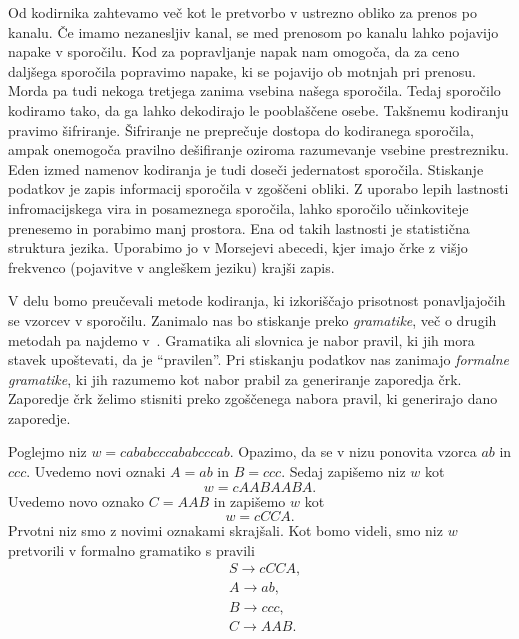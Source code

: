 \documentclass[fin1, tisk]{fmfdelo}
\theoremstyle{definition}
\begin{document}
Od kodirnika zahtevamo več kot le pretvorbo v ustrezno obliko za prenos po kanalu.
Če imamo nezanesljiv kanal, se med prenosom po kanalu lahko pojavijo napake v sporočilu.
Kod za popravljanje napak nam omogoča, da za ceno daljšega sporočila popravimo napake, ki se 
pojavijo ob motnjah pri prenosu. %
Morda pa tudi nekoga tretjega zanima vsebina našega sporočila. Tedaj sporočilo kodiramo
tako, da ga lahko dekodirajo le pooblaščene osebe. Takšnemu kodiranju pravimo
šifriranje. Šifriranje ne preprečuje dostopa do kodiranega sporočila, ampak onemogoča pravilno
dešifiranje oziroma razumevanje vsebine prestrezniku. %
Eden izmed namenov kodiranja je tudi doseči jedernatost sporočila. Stiskanje podatkov 
je zapis informacij sporočila v zgoščeni obliki. Z uporabo lepih lastnosti infromacijskega vira 
in posameznega sporočila, lahko sporočilo učinkoviteje prenesemo in porabimo manj prostora. Ena 
od takih lastnosti je statistična struktura jezika. Uporabimo jo v Morsejevi abecedi, kjer
imajo črke z višjo frekvenco (pojavitve v angleškem jeziku) krajši zapis. %

V delu bomo preučevali metode kodiranja, ki izkoriščajo prisotnost ponavljajočih se vzorcev
v sporočilu. Zanimalo nas bo stiskanje preko \emph{gramatike}, več o drugih metodah pa najdemo 
v~\cite{Sayood2017}. Gramatika ali slovnica je nabor pravil, ki jih mora stavek 
upoštevati, da je ``pravilen''. Pri stiskanju podatkov nas zanimajo \emph{formalne gramatike}, 
ki jih razumemo kot nabor prabil za generiranje zaporedja črk. Zaporedje črk želimo 
stisniti preko zgoščenega nabora pravil, ki generirajo dano zaporedje.

\begin{primer}
    \label{primer:motivacija}
    Poglejmo niz $w =\mathit{cababcccababcccab}$.
    Opazimo, da se v nizu ponovita vzorca $\mathit{ab}$ in $\mathit{ccc}$. Uvedemo novi oznaki
    $A = \mathit{ab}$ in $B = \mathit{ccc}$. Sedaj zapišemo niz $w$ kot
    \[
        w = \mathit{cAABAABA}.
    \]
    Uvedemo novo oznako $C = \mathit{AAB}$
    in zapišemo $w$ kot
    \[
        w = \mathit{cCCA}.
    \]
    Prvotni niz smo z novimi oznakami skrajšali. Kot bomo videli, smo niz $w$ pretvorili v 
    formalno gramatiko s pravili
    \begin{align*}
        & S  \rightarrow \mathit{cCCA}, \\
        & A  \rightarrow \mathit{ab}, \\
        & B  \rightarrow \mathit{ccc}, \\
        & C  \rightarrow \mathit{AAB}.
    \end{align*}
\end{primer}
\end{document}

